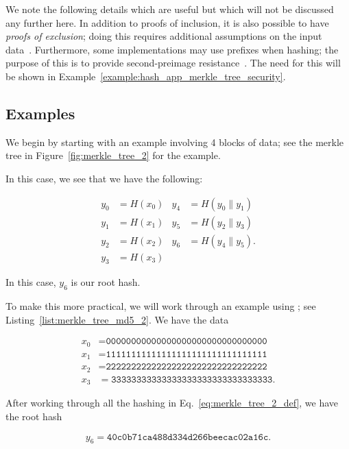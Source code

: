 We note the following details which are useful
but which will not be discussed any further here.
In addition to proofs of inclusion,
it is also possible to have \emph{proofs of exclusion};
doing this requires additional assumptions on the
input data~\cite{EfficientSMT}.
Furthermore, some implementations may use prefixes when hashing;
the purpose of this is to provide
second-preimage resistance~\cite{rfc6962,rfc9162}.
The need for this will be shown in
Example~\ref{example:hash_app_merkle_tree_security}.

\subsection{Examples}

\begin{example}

We begin by starting with an example involving 4 blocks of data;
see the \gls{merkle tree} in Figure~\ref{fig:merkle_tree_2}
for the example.



In this case, we see that we have the following:

\begin{align}
    y_{0} &= H(x_{0})
        &
    y_{4} &= H(y_{0}\|y_{1}) \nonumber\\
    y_{1} &= H(x_{1})
        &
    y_{5} &= H(y_{2}\|y_{3}) \nonumber\\
    y_{2} &= H(x_{2})
        &
    y_{6} &= H(y_{4}\|y_{5}). \nonumber\\
    y_{3} &= H(x_{3})
    \label{eq:merkle_tree_2_def}
\end{align}

\noindent
In this case, $y_{6}$ is our root hash.

To make this more practical, we will work through an example
using \MDFive{}; see Listing~\ref{list:merkle_tree_md5_2}.
We have the data

\begin{align}
    x_{0} &= \texttt{00000000000000000000000000000000}
        \nonumber\\
    x_{1} &= \texttt{11111111111111111111111111111111}
        \nonumber\\
    x_{2} &= \texttt{22222222222222222222222222222222}
        \nonumber\\
    x_{3} &= \texttt{33333333333333333333333333333333}.
\end{align}



\noindent
After working through all the hashing in Eq.~\eqref{eq:merkle_tree_2_def},
we have the root hash

\begin{equation}
    y_{6} = \texttt{40c0b71ca488d334d266beecac02a16c}.
\end{equation}
\end{example}


